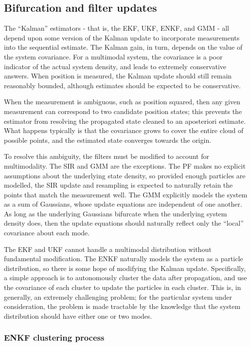 \documentclass[]{article}
\begin{document}
\subsection{Bifurcation and filter updates}

The ``Kalman'' estimators - that is, the EKF, UKF, ENKF, and GMM - all depend upon some version of the Kalman update to incorporate measurements into the sequential estimate. The Kalman gain, in turn, depends on the value of the system covariance. For a multimodal system, the covariance is a poor indicator of the actual system density, and leads to extremely conservative answers. When position is measured, the Kalman update should still remain reasonably bounded, although estimates should be expected to be conservative.

When the measurement is ambiguous, such as position squared, then any given measurement can correspond to two candidate position states; this prevents the estimator from resolving the propagated state cleaned to an aposteriori estimate. What happens typically is that the covariance grows to cover the entire cloud of possible points, and the estimated state converges towards the origin.

To resolve this ambiguity, the filters must be modified to account for multimodality. The SIR and GMM are the exceptions. The PF makes no explicit assumptions about the underlying state density, so provided enough particles are modelled, the SIR update and resampling is expected to naturally retain the points that match the measurement well. The GMM explicitly models the system as a sum of Gaussians, whose update equations are independent of one another. As long as the underlying Gaussians bifurcate when the underlying system density does, then the update equations should naturally reflect only the ``local'' covariance about each mode.

The EKF and UKF cannot handle a multimodal distribution without fundamental modification. The ENKF naturally models the system as a particle distribution, so there is some hope of modifying the Kalman update. Specifically, a simple approach is to autonomously cluster the data after propagation, and use the covariance of each cluster to update the particles in each cluster. This is, in generally, an extremely challenging problem; for the particular system under consideration, the problem is made tractable by the knowledge that the system distribution should have either one or two modes.

\subsubsection{ENKF clustering process}
\end{document}
